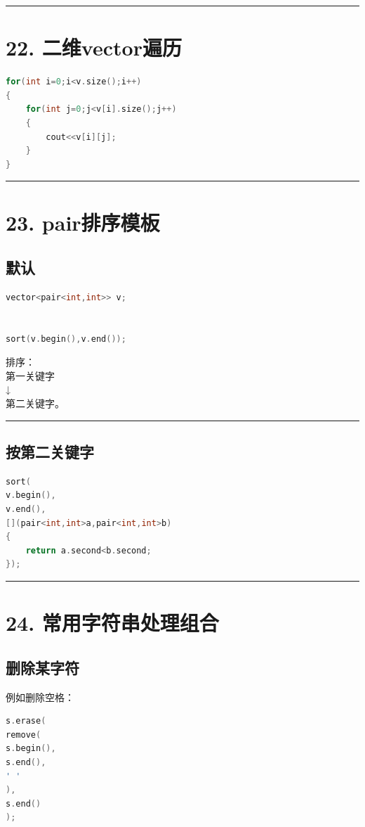 \documentclass[9pt,twocolumn]{extarticle}
\begin{document}
\noindent\rule{\linewidth}{0.4pt}

\section{22. 二维vector遍历}
\begin{lstlisting}[language=C++]
for(int i=0;i<v.size();i++)
{
    for(int j=0;j<v[i].size();j++)
    {
        cout<<v[i][j];
    }
}
\end{lstlisting}

\noindent\rule{\linewidth}{0.4pt}

\section{23. pair排序模板}

\subsection{默认}
\begin{lstlisting}[language=C++]
vector<pair<int,int>> v;


sort(v.begin(),v.end());
\end{lstlisting}
排序：\\
第一关键字\\
↓\\
第二关键字。

\noindent\rule{\linewidth}{0.4pt}

\subsection{按第二关键字}
\begin{lstlisting}[language=C++]
sort(
v.begin(),
v.end(),
[](pair<int,int>a,pair<int,int>b)
{
    return a.second<b.second;
});
\end{lstlisting}

\noindent\rule{\linewidth}{0.4pt}

\section{24. 常用字符串处理组合}

\subsection{删除某字符}
例如删除空格：
\begin{lstlisting}[language=C++]
s.erase(
remove(
s.begin(),
s.end(),
' '
),
s.end()
);
\end{lstlisting}
\end{document}
